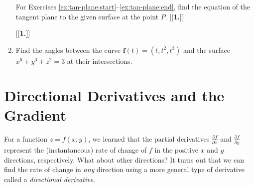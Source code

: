 \begin{enumerate}[\bfseries 1.]
\par\noindent For Exercises \ref{ex:tan-plane:start}--\ref{ex:tan-plane:end}, find the equation of the tangent plane to the given surface at the point $P$.
[{[\bfseries 1.]}]
[{[\bfseries 1.]}]
\item Find the angles between the curve 
$\mathbf{f}(t)=(t,t^2,t^3)$
and the surface 
$x^6+y^3+z^2=3$
at their intersections.
\end{enumerate}


\newpage
\section{Directional Derivatives and the Gradient}
For a function $z=f(x,y)$, we learned that the partial derivatives $\tfrac{\partial f}{\partial x}$ and
$\tfrac{\partial f}{\partial y}$ represent the (instantaneous) rate of change of $f$ in the positive $x$ and $y$
directions, respectively. What about other directions? It turns out that we can find the rate of change in
\emph{any} direction using a more general type of derivative called a \emph{directional derivative}.

